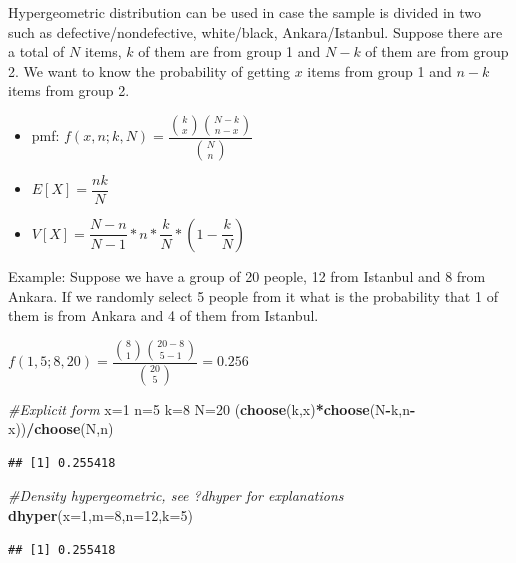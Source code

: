 \documentclass[]{book}
\newenvironment{Shaded}{\begin{snugshade}}{\end{snugshade}}
\newcommand{\CommentTok}[1]{\textcolor[rgb]{0.56,0.35,0.01}{\textit{#1}}}
\newcommand{\DataTypeTok}[1]{\textcolor[rgb]{0.13,0.29,0.53}{#1}}
\newcommand{\DecValTok}[1]{\textcolor[rgb]{0.00,0.00,0.81}{#1}}
\newcommand{\KeywordTok}[1]{\textcolor[rgb]{0.13,0.29,0.53}{\textbf{#1}}}
\newcommand{\NormalTok}[1]{#1}
\newcommand{\OperatorTok}[1]{\textcolor[rgb]{0.81,0.36,0.00}{\textbf{#1}}}
\theoremstyle{definition}
\theoremstyle{definition}
\theoremstyle{definition}
\theoremstyle{remark}
\begin{document}
Hypergeometric distribution can be used in case the sample is divided in
two such as defective/nondefective, white/black, Ankara/Istanbul.
Suppose there are a total of \(N\) items, \(k\) of them are from group 1
and \(N-k\) of them are from group 2. We want to know the probability of
getting \(x\) items from group 1 and \(n-k\) items from group 2.

\begin{itemize}
\item
  pmf:
  \(f(x,n;k,N) = \dfrac{\binom{k}{x}\binom{N-k}{n-x}}{\binom{N}{n}}\)
\item
  \(E[X] = \dfrac{nk}{N}\)
\item
  \(V[X] = \dfrac{N-n}{N-1}*n*\dfrac{k}{N}*(1-\dfrac{k}{N})\)
\end{itemize}

Example: Suppose we have a group of 20 people, 12 from Istanbul and 8
from Ankara. If we randomly select 5 people from it what is the
probability that 1 of them is from Ankara and 4 of them from Istanbul.

\(f(1,5;8,20) = \dfrac{\binom{8}{1}\binom{20-8}{5-1}}{\binom{20}{5}} = 0.256\)

\begin{Shaded}
\begin{Highlighting}[]
\CommentTok{#Explicit form}
\NormalTok{x=}\DecValTok{1}
\NormalTok{n=}\DecValTok{5}
\NormalTok{k=}\DecValTok{8}
\NormalTok{N=}\DecValTok{20}
\NormalTok{(}\KeywordTok{choose}\NormalTok{(k,x)}\OperatorTok{*}\KeywordTok{choose}\NormalTok{(N}\OperatorTok{-}\NormalTok{k,n}\OperatorTok{-}\NormalTok{x))}\OperatorTok{/}\KeywordTok{choose}\NormalTok{(N,n)}
\end{Highlighting}
\end{Shaded}

\begin{verbatim}
## [1] 0.255418
\end{verbatim}

\begin{Shaded}
\begin{Highlighting}[]
\CommentTok{#Density hypergeometric, see ?dhyper for explanations}
\KeywordTok{dhyper}\NormalTok{(}\DataTypeTok{x=}\DecValTok{1}\NormalTok{,}\DataTypeTok{m=}\DecValTok{8}\NormalTok{,}\DataTypeTok{n=}\DecValTok{12}\NormalTok{,}\DataTypeTok{k=}\DecValTok{5}\NormalTok{)}
\end{Highlighting}
\end{Shaded}

\begin{verbatim}
## [1] 0.255418
\end{verbatim}
\end{document}

